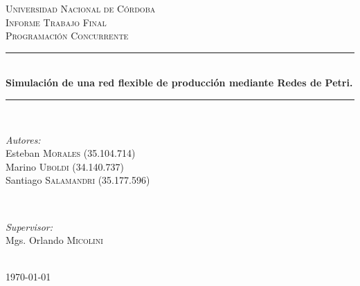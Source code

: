 \documentclass[12pt]{article} %
\begin{document}

\begin{titlepage}

\newcommand{\HRule}{\rule{\linewidth}{0.5mm}} %

\center %

\textsc{\LARGE Universidad Nacional de Córdoba}\\[1.5cm] %
\textsc{\Large Informe Trabajo Final}\\[0.5cm] %
\textsc{\large Programación Concurrente}\\[0.5cm] %

\HRule \\[0.4cm]
\Large{ \huge \bfseries Simulación de una red flexible de producción mediante Redes de Petri.}\par %
\HRule \\[1.5cm]

\begin{minipage}{0.5\textwidth}
\begin{flushleft} \large
\emph{Autores:}\\
Esteban \textsc{Morales} (35.104.714)\\
Marino \textsc{Uboldi} (34.140.737)\\
Santiago \textsc{Salamandri} (35.177.596)\\
\end{flushleft}
\end{minipage}
~
\begin{minipage}{0.4\textwidth}
\begin{flushright} \large
\emph{Supervisor:} \\
Mgs. Orlando \textsc{Micolini}
\end{flushright}
\end{minipage}\\[4cm]

{\large \today}\\[3cm] %


\vfill %
\restoregeometry
\end{titlepage}
\end{document}
